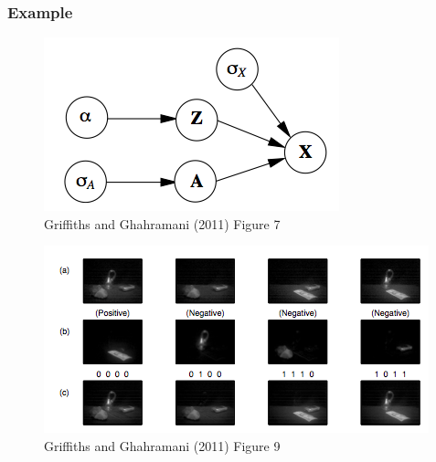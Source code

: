 \documentclass[13pt]{beamer}
\begin{document}
\begin{frame}
\frametitle{Example}

\begin{figure}
\begin{center}
\includegraphics[scale=0.3]{./img/graphical-model-gaussian.png}
\caption{Griffiths and Ghahramani (2011) Figure 7}
\end{center}
\end{figure}

\begin{figure}
\begin{center}
\includegraphics[scale=0.3]{./img/ibp-example-photos.png}
\caption{Griffiths and Ghahramani (2011) Figure 9}
\end{center}
\end{figure}

\end{frame}
\end{document}
